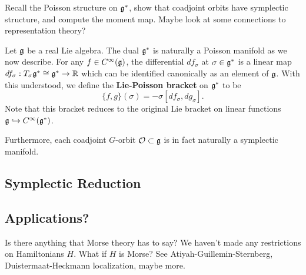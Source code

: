 \documentclass{amsart}
\begin{document}
\begin{example}
    Recall the Poisson structure on $\mathfrak g^*$, show that coadjoint orbits have symplectic
    structure, and compute the moment map. Maybe look at some connections to representation
    theory?

    Let $\mathfrak g$ be a real Lie algebra. The dual $\mathfrak g^*$ is naturally a Poisson manifold 
    as we now describe. For any $f\in C^\infty(\mathfrak g)$, the differential $df_\sigma$ at
    $\sigma\in\mathfrak g^*$ is a linear map $df_\sigma:T_\sigma\mathfrak g^*\cong\mathfrak g^*\to\mathbb{R}$ which
    can be identified canonically as an element of $\mathfrak g$. With this understood, we
    define the \textbf{Lie-Poisson bracket} on $\mathfrak g^*$ to be
    \begin{equation*}
        \{f,g\}(\sigma) = -\sigma[df_\sigma,dg_\sigma].
    \end{equation*}
    Note that this bracket reduces to the original Lie bracket on linear functions
    $\mathfrak g\hookrightarrow C^\infty(\mathfrak g^*)$.

    Furthermore, each coadjoint $G$-orbit $\mathcal{O}\subset\mathfrak g$ is in fact naturally a
    symplectic manifold.
\end{example}

\subsection{Symplectic Reduction}

\subsection{Applications?}

Is there anything that Morse theory has to say? We haven't made any restrictions on Hamiltonians
$H$. What if $H$ is Morse?  See Atiyah-Guillemin-Sternberg, Duistermaat-Heckmann localization, maybe more.
\end{document}
